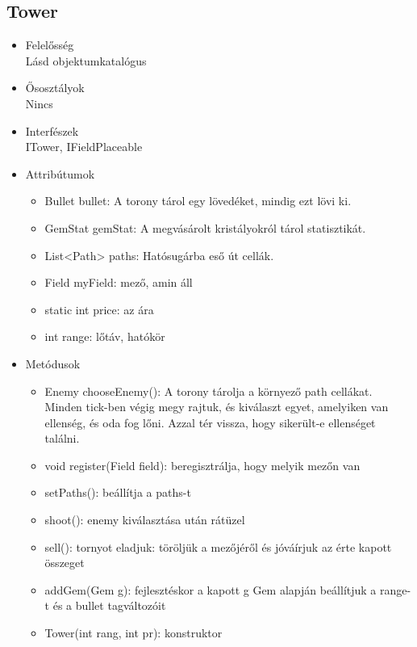 \subsection{Tower}
\begin{itemize}
\item Felelősség\\
Lásd objektumkatalógus
\item Ősosztályok\\
Nincs
\item Interfészek\\
ITower, IFieldPlaceable
\item Attribútumok
	\begin{itemize}
		\item Bullet bullet: A torony tárol egy lövedéket, mindig ezt lövi ki.
		\item GemStat gemStat: A megvásárolt kristályokról tárol  statisztikát.
		\item List<Path> paths: Hatósugárba eső út cellák.
		\item Field myField: mező, amin áll
		\item static int price: az ára
		\item int range: lőtáv, hatókör

		
	\end{itemize}
\item Metódusok
	\begin{itemize}
		\item Enemy chooseEnemy(): A torony tárolja a környező path cellákat. Minden tick-ben végig megy rajtuk, és kiválaszt egyet, amelyiken van ellenség, és oda fog lőni. Azzal tér vissza, hogy sikerült-e ellenséget találni.
		\item void register(Field field): beregisztrálja, hogy melyik mezőn van
		\item setPaths(): beállítja a paths-t
		\item shoot(): enemy kiválasztása után rátüzel
		\item sell(): tornyot eladjuk: töröljük a mezőjéről és jóváírjuk az érte kapott összeget
		\item addGem(Gem g): fejlesztéskor a kapott g Gem alapján beállítjuk a range-t és a bullet tagváltozóit
		\item Tower(int rang, int pr): konstruktor
		
		
	\end{itemize}
\end{itemize}
